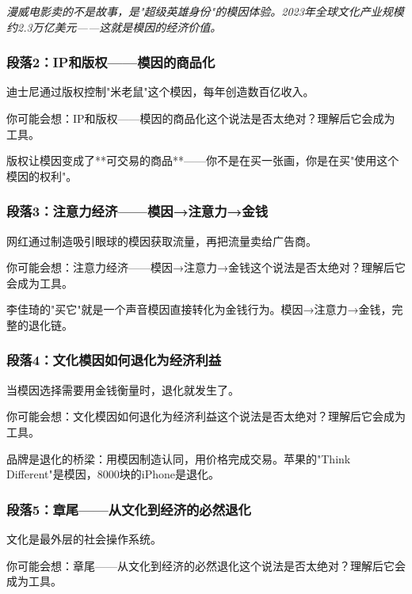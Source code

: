 \documentclass[a4paper,12pt]{book}
\newenvironment{motivation}{\begin{tcolorbox}[colback=gray!10,colframe=gray!60,title=\textit{本章动机 (Motivation)},fonttitle=\bfseries,arc=0mm,leftrule=3mm]\small\itshape}{\end{tcolorbox}}
\begin{document}
\begin{motivation}
\begin{motivation}
\begin{motivation}
漫威电影卖的不是故事，是"超级英雄身份"的模因体验。2023年全球文化产业规模约2.3万亿美元——这就是模因的经济价值。

	\subsubsection*{段落2：IP和版权——模因的商品化}
	迪士尼通过版权控制"米老鼠"这个模因，每年创造数百亿收入。
	\begin{tcolorbox}[colback=yellow!5, title=\textit{读者行为预测}]
		你可能会想：IP和版权——模因的商品化这个说法是否太绝对？理解后它会成为工具。
	\end{tcolorbox}

版权让模因变成了**可交易的商品**——你不是在买一张画，你是在买"使用这个模因的权利"。

	\subsubsection*{段落3：注意力经济——模因→注意力→金钱}
	网红通过制造吸引眼球的模因获取流量，再把流量卖给广告商。
	\begin{tcolorbox}[colback=yellow!5, title=\textit{读者行为预测}]
		你可能会想：注意力经济——模因→注意力→金钱这个说法是否太绝对？理解后它会成为工具。
	\end{tcolorbox}

李佳琦的"买它"就是一个声音模因直接转化为金钱行为。模因→注意力→金钱，完整的退化链。

	\subsubsection*{段落4：文化模因如何退化为经济利益}
	当模因选择需要用金钱衡量时，退化就发生了。
	\begin{tcolorbox}[colback=yellow!5, title=\textit{读者行为预测}]
		你可能会想：文化模因如何退化为经济利益这个说法是否太绝对？理解后它会成为工具。
	\end{tcolorbox}

品牌是退化的桥梁：用模因制造认同，用价格完成交易。苹果的"Think Different"是模因，8000块的iPhone是退化。

	\subsubsection*{段落5：章尾——从文化到经济的必然退化}
	文化是最外层的社会操作系统。
	\begin{tcolorbox}[colback=yellow!5, title=\textit{读者行为预测}]
		你可能会想：章尾——从文化到经济的必然退化这个说法是否太绝对？理解后它会成为工具。
	\end{tcolorbox}


\end{motivation}
\end{motivation}
\end{motivation}
\end{document}

